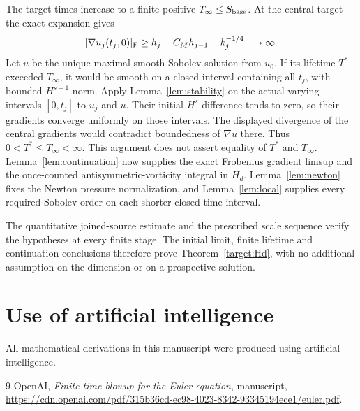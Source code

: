 \documentclass[11pt]{article}
\theoremstyle{definition}
\begin{document}
The target times increase to a finite positive $T_\infty\leq S_{\rm base}$.
At the central target the exact expansion gives
\[
 |\nabla u_j(t_j,0)|_{\rm F}
       \geq h_j-C_Mh_{j-1}-k_j^{-1/4}\longrightarrow\infty.
\]
Let $u$ be the unique maximal smooth Sobolev solution from $u_0$.
If its lifetime $T^*$ exceeded $T_\infty$, it would be smooth on a
closed interval containing all $t_j$, with bounded $H^{s+1}$ norm.
Apply Lemma~\ref{lem:stability} on the actual varying intervals
$[0,t_j]$ to $u_j$ and $u$. Their initial $H^s$ difference tends to
zero, so their gradients converge uniformly on those intervals.
The displayed divergence of the central gradients would contradict
boundedness of $\nabla u$ there. Thus $0<T^*\leq T_\infty<\infty$.
This argument does not assert equality of $T^*$ and $T_\infty$.
Lemma~\ref{lem:continuation} now supplies the exact Frobenius gradient
limsup and the once-counted antisymmetric-vorticity integral in $H_d$.
Lemma~\ref{lem:newton} fixes the Newton pressure normalization, and
Lemma~\ref{lem:local} supplies every required Sobolev order on each
shorter closed time interval.

The quantitative joined-source estimate and the prescribed scale
sequence verify the hypotheses at every finite stage. The initial limit,
finite lifetime and continuation conclusions therefore prove
Theorem~\ref{target:Hd}, with no additional assumption on the dimension
or on a prospective solution.

\section*{Use of artificial intelligence}
All mathematical derivations in this manuscript were produced using
artificial intelligence.

\begin{thebibliography}{9}
OpenAI, \emph{Finite time blowup for the Euler equation}, manuscript,
\url{https://cdn.openai.com/pdf/315b36cd-ec98-4023-8342-93345194ece1/euler.pdf}.
\end{thebibliography}
\end{document}
